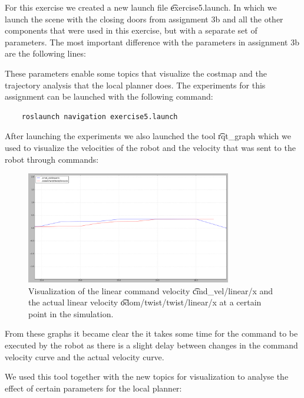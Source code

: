 
For this exercise we created a new launch file \t{exercise5.launch}. In which we launch the scene with the closing doors from assignment 3b and all the other components that were used in this exercise, but with a separate set of parameters. The most important difference with the parameters in assignment 3b are the following lines:



These parameters enable some topics that visualize the costmap and the trajectory analysis that the local planner does.
The experiments for this assignment can be launched with the following command:

\begin{lstlisting}
	roslaunch navigation exercise5.launch
\end{lstlisting}

After launching the experiments we also launched the tool \t{rqt_graph} which we used to visualize the velocities of the robot and the velocity that was sent to the robot through commands:

\begin{figure}
	\centering
	\includegraphics[width=0.80\textwidth]{./img/graph}
	\caption{Visualization of the linear command velocity \t{cmd_vel/linear/x} and the actual linear velocity \t{odom/twist/twist/linear/x} at a certain point in the simulation.}
	\label{fig:5:graph}
\end{figure}

From these graphs it became clear the it takes some time for the command to be executed by the robot as there is a slight delay between changes in the command velocity curve and the actual velocity curve.

We used this tool together with the new topics for visualization to analyse the effect of certain parameters for the local planner:

